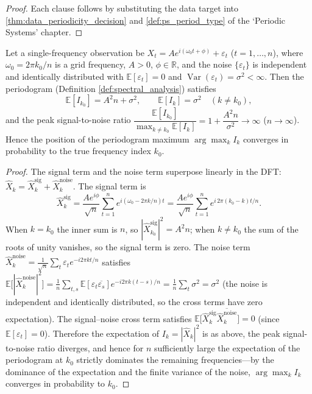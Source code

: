 \begin{proof}
Each clause follows by substituting the data target into \cref{thm:data_periodicity_decision} and \cref{def:ps_period_type} of the `Periodic Systems' chapter.
\end{proof}

\begin{lemma}\label{ch31_periodogram_peak}
Let a single-frequency observation be $X_t = A e^{i(\omega_0 t + \phi)} + \varepsilon_t$ ($t = 1,\dots,n$), where $\omega_0 = 2\pi k_0 / n$ is a grid frequency, $A > 0$, $\phi \in \mathbb{R}$, and the noise $\{\varepsilon_t\}$ is independent and identically distributed with $\mathbb{E}[\varepsilon_t] = 0$ and $\operatorname{Var}(\varepsilon_t) = \sigma^2 < \infty$. Then the periodogram (Definition \ref{def:spectral_analysis}) satisfies
\[
\mathbb{E}[I_{k_0}] = A^2 n + \sigma^2, \qquad \mathbb{E}[I_k] = \sigma^2 \quad (k \neq k_0),
\]
and the peak signal-to-noise ratio $\dfrac{\mathbb{E}[I_{k_0}]}{\max_{k \neq k_0} \mathbb{E}[I_k]} = 1 + \dfrac{A^2 n}{\sigma^2} \to \infty$ ($n \to \infty$). Hence the position of the periodogram maximum $\arg\max_k I_k$ converges in probability to the true frequency index $k_0$.
\end{lemma}

\begin{proof}
The signal term and the noise term superpose linearly in the DFT: $\hat{X}_k = \hat{X}_k^{\text{sig}} + \hat{X}_k^{\text{noise}}$. The signal term is
\[
\hat{X}_k^{\text{sig}} = \frac{A e^{i\phi}}{\sqrt{n}} \sum_{t=1}^{n} e^{i(\omega_0 - 2\pi k/n)t} = \frac{A e^{i\phi}}{\sqrt{n}} \sum_{t=1}^{n} e^{i\,2\pi(k_0 - k)t/n}.
\]
When $k = k_0$ the inner sum is $n$, so $|\hat{X}_{k_0}^{\text{sig}}|^2 = A^2 n$; when $k \neq k_0$ the sum of the roots of unity vanishes, so the signal term is zero. The noise term $\hat{X}_k^{\text{noise}} = \frac{1}{\sqrt{n}}\sum_t \varepsilon_t e^{-i2\pi kt/n}$ satisfies $\mathbb{E}\big[|\hat{X}_k^{\text{noise}}|^2\big] = \frac{1}{n}\sum_{t,s} \mathbb{E}[\varepsilon_t \overline{\varepsilon_s}] e^{-i2\pi k(t-s)/n} = \frac{1}{n}\sum_t \sigma^2 = \sigma^2$ (the noise is independent and identically distributed, so the cross terms have zero expectation). The signal--noise cross term satisfies $\mathbb{E}\big[\hat{X}_k^{\text{sig}}\overline{\hat{X}_k^{\text{noise}}}\big] = 0$ (since $\mathbb{E}[\varepsilon_t] = 0$). Therefore the expectation of $I_k = |\hat{X}_k|^2$ is as above, the peak signal-to-noise ratio diverges, and hence for $n$ sufficiently large the expectation of the periodogram at $k_0$ strictly dominates the remaining frequencies---by the dominance of the expectation and the finite variance of the noise, $\arg\max_k I_k$ converges in probability to $k_0$.
\end{proof}

